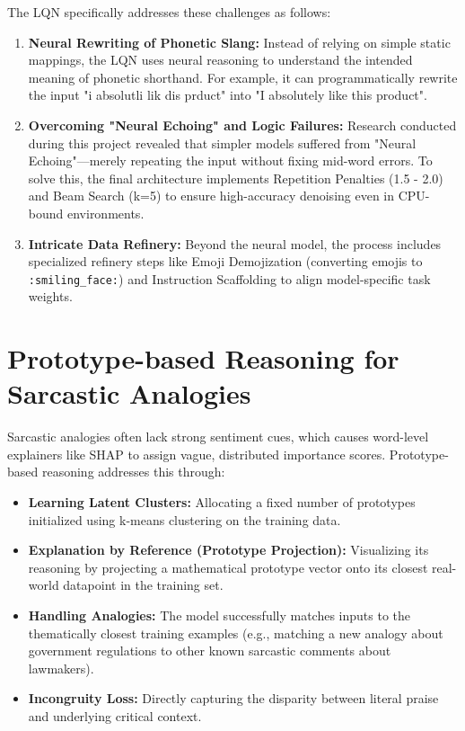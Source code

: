 \documentclass[11pt,oneside]{scrbook}
\begin{document}
The LQN specifically addresses these challenges as follows:
\begin{enumerate}
    \item \textbf{Neural Rewriting of Phonetic Slang:} Instead of relying on simple static mappings, the LQN uses neural reasoning to understand the intended meaning of phonetic shorthand. For example, it can programmatically rewrite the input "i absolutli lik dis prduct" into "I absolutely like this product".
    \item \textbf{Overcoming "Neural Echoing" and Logic Failures:} Research conducted during this project revealed that simpler models suffered from "Neural Echoing"---merely repeating the input without fixing mid-word errors. To solve this, the final architecture implements Repetition Penalties (1.5 - 2.0) and Beam Search (k=5) to ensure high-accuracy denoising even in CPU-bound environments.
    \item \textbf{Intricate Data Refinery:} Beyond the neural model, the process includes specialized refinery steps like Emoji Demojization (converting emojis to \texttt{:smiling\_face:}) and Instruction Scaffolding to align model-specific task weights.
\end{enumerate}

\section{Prototype-based Reasoning for Sarcastic Analogies}
Sarcastic analogies often lack strong sentiment cues, which causes word-level explainers like SHAP to assign vague, distributed importance scores. Prototype-based reasoning addresses this through:
\begin{itemize}
    \item \textbf{Learning Latent Clusters:} Allocating a fixed number of prototypes initialized using k-means clustering on the training data.
    \item \textbf{Explanation by Reference (Prototype Projection):} Visualizing its reasoning by projecting a mathematical prototype vector onto its closest real-world datapoint in the training set.
    \item \textbf{Handling Analogies:} The model successfully matches inputs to the thematically closest training examples (e.g., matching a new analogy about government regulations to other known sarcastic comments about lawmakers).
    \item \textbf{Incongruity Loss:} Directly capturing the disparity between literal praise and underlying critical context.
\end{itemize}
\end{document}
